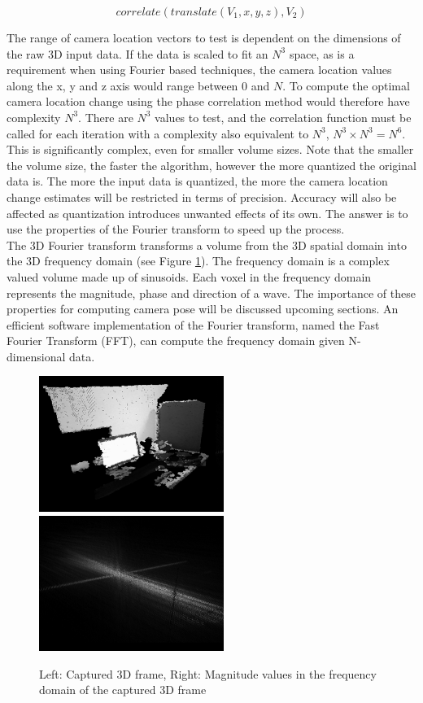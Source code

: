 \begin{equation} \label{eqn:CrossCorrelationEquation11}
correlate(translate(V_1, x,y,z), V_2)
\end{equation}

The range of camera location vectors to test is dependent on the dimensions of the raw 3D input data. If the data is scaled to fit an $N^3$ space, as is a requirement when using Fourier based techniques, the camera location values along the x, y and z axis would range between 0 and $N$. To compute the optimal camera location change using the phase correlation method would therefore have complexity $N^3$. There are $N^3$ values to test, and the correlation function must be called for each iteration with a complexity also equivalent to $N^3$, $N^3 \times N^3 = N^6$. This is significantly complex, even for smaller volume sizes. Note that the smaller the volume size, the faster the algorithm, however the more quantized the original data is. The more the input data is quantized, the more the camera location change estimates will be restricted in terms of precision. Accuracy will also be affected as quantization introduces unwanted effects of its own. The answer is to use the properties of the Fourier transform to speed up the process.  \\

The 3D Fourier transform transforms a volume from the 3D spatial domain into the 3D frequency domain (see Figure \ref{fig:FrequencyDomainExample}). The frequency domain is a complex valued volume made up of sinusoids. Each voxel in the frequency domain represents the magnitude, phase and direction of a wave. The importance of these properties for computing camera pose will be discussed upcoming sections. An efficient software implementation of the Fourier transform, named the Fast Fourier Transform (FFT), can compute the frequency domain given N-dimensional data. \\


\begin{figure}[!htb]
\centering
\includegraphics[width=6cm]{images/methodology/FVR/capFrameOriginal}
\includegraphics[width=6cm]{images/methodology/FVR/capFrameMagFFT}
\caption{Left: Captured 3D frame, Right: Magnitude values in the frequency domain of the captured 3D frame}
\label{fig:FrequencyDomainExample}
\end{figure}
 


